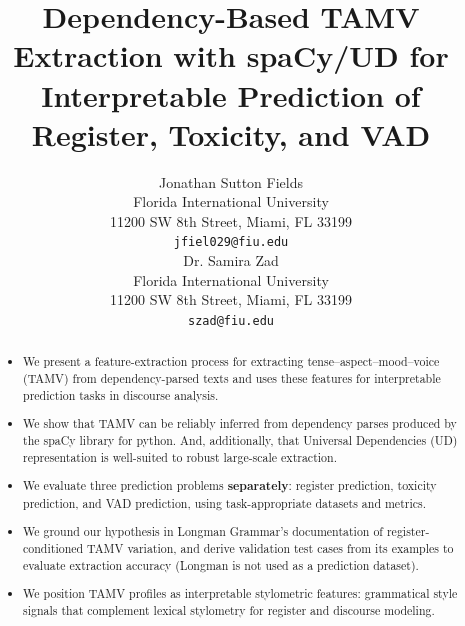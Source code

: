 \documentclass[11pt]{article}
\title{Dependency-Based TAMV Extraction with spaCy/UD for Interpretable Prediction of Register, Toxicity, and VAD}
\author{Jonathan Sutton Fields \\
  Florida International University \\
  11200 SW 8th Street, Miami, FL 33199 \\
  \texttt{jfiel029@fiu.edu} \\\And
  Dr. Samira Zad \\
  Florida International University \\
  11200 SW 8th Street, Miami, FL 33199 \\
  \texttt{szad@fiu.edu} \\}
\begin{document}
\maketitle

\begin{abstract}
\begin{itemize}
  \item We present a feature-extraction process for extracting tense--aspect--mood--voice (TAMV) from dependency-parsed texts and uses these features for interpretable prediction tasks in discourse analysis.
  \item We show that TAMV can be reliably inferred from dependency parses produced by the spaCy library for python. And, additionally, that Universal Dependencies (UD) representation is well-suited to robust large-scale extraction. \citep{Ramm2017AnnotatingGerman,Nivre2010DependencyParsing,Okhapkin2021ConstructingLibraries}
  \item We evaluate three prediction problems \textbf{separately}: register prediction, toxicity prediction, and VAD prediction, using task-appropriate datasets and metrics.
  \item We ground our hypothesis in Longman Grammar's documentation of register-conditioned TAMV variation, and derive validation test cases from its examples to evaluate extraction accuracy (Longman is not used as a prediction dataset). \citep{Biber20101999LongmanEnglish}
  \item We position TAMV profiles as interpretable stylometric features: grammatical style signals that complement lexical stylometry for register and discourse modeling. \citep{Stamatatos2009SurveyMethods,Koppel2009ComputationalMethods}
\end{itemize}
\end{abstract}
\end{document}
